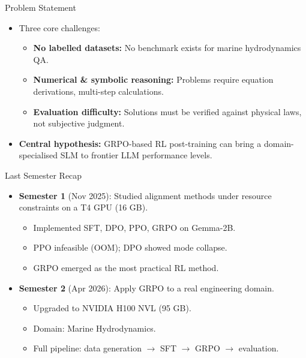 \documentclass[10pt]{beamer}
\begin{document}
\begin{frame}{Problem Statement}
\large
\begin{itemize}
    \item Three core challenges:
    \vspace{0.2cm}
    \begin{itemize}
        \item \textbf{No labelled datasets:} No benchmark exists for marine hydrodynamics QA.
        \vspace{0.15cm}
        \item \textbf{Numerical \& symbolic reasoning:} Problems require equation derivations, multi-step calculations.
        \vspace{0.15cm}
        \item \textbf{Evaluation difficulty:} Solutions must be verified against physical laws, not subjective judgment.
    \end{itemize}
    \vspace{0.3cm}

    \item \textbf{Central hypothesis:} GRPO-based RL post-training can bring a domain-specialised SLM to frontier LLM performance levels.
\end{itemize}
\end{frame}

\begin{frame}{Last Semester Recap}
\large
\begin{itemize}
    \item \textbf{Semester 1} (Nov 2025): Studied alignment methods under resource constraints on a T4 GPU (16 GB).
    \vspace{0.2cm}
    \begin{itemize}
        \item Implemented SFT, DPO, PPO, GRPO on Gemma-2B.
        \item PPO infeasible (OOM); DPO showed mode collapse.
        \item GRPO emerged as the most practical RL method.
    \end{itemize}
    \vspace{0.3cm}

    \item \textbf{Semester 2} (Apr 2026): Apply GRPO to a real engineering domain.
    \begin{itemize}
        \item Upgraded to NVIDIA H100 NVL (95 GB).
        \item Domain: Marine Hydrodynamics.
        \item Full pipeline: data generation $\to$ SFT $\to$ GRPO $\to$ evaluation.
    \end{itemize}
\end{itemize}
\end{frame}
\end{document}
